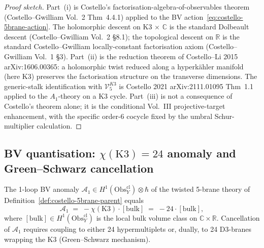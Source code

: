 \begin{proof}[Proof sketch]
Part~(i) is Costello's factorisation-algebra-of-observables
theorem (Costello--Gwilliam Vol.~2 Thm~4.4.1) applied to the
BV action~\eqref{eq:costello-5brane-action}. The
holomorphic descent on K3 $\times$ $\mathbb{C}$ is the standard
Dolbeault descent (Costello--Gwilliam Vol.~2 \S8.1); the
topological descent on $\mathbb{R}$ is the standard
Costello--Gwilliam locally-constant factorisation axiom
(Costello--Gwilliam Vol.~1 \S3). Part~(ii) is the reduction
theorem of Costello--Li 2015 arXiv:1606.00365: a holomorphic
twist reduced along a hyperk\"ahler manifold (here K3) preserves
the factorisation structure on the transverse dimensions. The
generic-stalk identification with $\mathcal V^{K3}_5$ is
Costello 2021 arXiv:2111.01095 Thm~1.1 applied to the
$A_1$-theory on a K3 cycle. Part~(iii) is not a consequence of
Costello's theorem alone; it is the conditional Vol.~III
projective-target enhancement, with the specific order-$6$ cocycle
fixed by the umbral Schur-multiplier calculation.
\end{proof}

\subsection{BV quantisation: $\chi(\mathrm{K3}) = 24$ anomaly
and Green--Schwarz cancellation}
\label{subsec:costello-bv-anomaly}

\begin{theorem}[1-loop BV anomaly is $-\chi(\mathrm{K3}) =
-24$; \ClaimStatusProvedHere, chain-level]
\label{thm:costello-bv-anomaly}
The 1-loop BV anomaly $\mathcal A_1 \in
H^1(\mathrm{Obs}^{\mathrm{cl}}_Y)\otimes\hbar$ of the twisted
5-brane theory of
Definition~\ref{def:costello-5brane-parent}
equals
\begin{equation}
\label{eq:costello-1loop-anomaly-chi}
\mathcal A_1 \;=\; -\chi(\mathrm{K3})\cdot[\mathrm{bulk}]
\;=\; -24\cdot[\mathrm{bulk}],
\end{equation}
where $[\mathrm{bulk}] \in
H^1(\mathrm{Obs}^{\mathrm{cl}}_Y)$ is the local bulk volume class
on $\mathbb{C}\times\mathbb{R}$. Cancellation of $\mathcal A_1$
requires coupling to either 24 hypermultiplets or, dually, to 24
D3-branes wrapping the K3 (Green--Schwarz mechanism).
\end{theorem}

